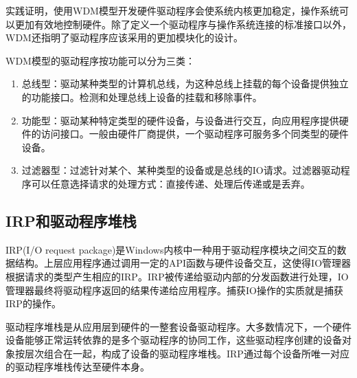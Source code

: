 实践证明，使用WDM模型开发硬件驱动程序会使系统内核更加稳定，操作系统可以更加有效地控制硬件。除了定义一个驱动程序与操作系统连接的标准接口以外，WDM还指明了驱动程序应该采用的更加模块化的设计。

WDM模型的驱动程序按功能可以分为三类：
\begin{enumerate}
\item
总线型：驱动某种类型的计算机总线，为这种总线上挂载的每个设备提供独立的功能接口。检测和处理总线上设备的挂载和移除事件。
\item
功能型：驱动某种特定类型的硬件设备，与设备进行交互，向应用程序提供硬件的访问接口。一般由硬件厂商提供，一个驱动程序可服务多个同类型的硬件设备。
\item
过滤器型：过滤针对某个、某种类型的设备或是总线的IO请求。过滤器驱动程序可以任意选择请求的处理方式：直接传递、处理后传递或是丢弃。
\end{enumerate}

\subsection{IRP和驱动程序堆栈}
IRP(I/O request package)是Windows内核中一种用于驱动程序模块之间交互的数据结构。上层应用程序通过调用一定的API函数与硬件设备交互，这使得IO管理器根据请求的类型产生相应的IRP。IRP被传递给驱动内部的分发函数进行处理，IO管理器最终将驱动程序返回的结果传递给应用程序。捕获IO操作的实质就是捕获IRP的操作。

驱动程序堆栈是从应用层到硬件的一整套设备驱动程序。大多数情况下，一个硬件设备能够正常运转依靠的是多个驱动程序的协同工作，这些驱动程序创建的设备对象按层次组合在一起，构成了设备的驱动程序堆栈。IRP通过每个设备所唯一对应的驱动程序堆栈传达至硬件本身。

